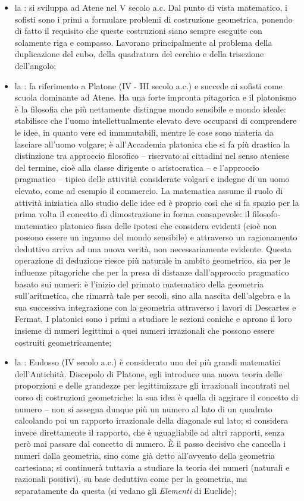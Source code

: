 \begin{itemize}
	\item la : si sviluppa ad Atene nel V secolo a.c. Dal punto di vista matematico, i sofisti sono i primi a formulare problemi di costruzione geometrica, ponendo di fatto il requisito che queste costruzioni siano sempre eseguite con solamente riga e compasso. Lavorano principalmente al problema della duplicazione del cubo, della quadratura del cerchio e della trisezione dell'angolo;
	\item la : fa riferimento a Platone (IV - III secolo a.c.) e succede ai sofisti come scuola dominante ad Atene. Ha una forte impronta pitagorica e il platonismo \`e la filosofia che pi\`u nettamente distingue mondo sensibile e mondo ideale: stabilisce che l'uomo intellettualmente elevato deve occuparsi di comprendere le idee, in quanto vere ed immmutabili, mentre le cose sono materia da lasciare all'uomo volgare; \`e all'Accademia platonica che si fa pi\`u drastica la distinzione tra approccio filosofico -- riservato ai cittadini nel senso ateniese del termine, cio\`e alla classe dirigente o aristocratica -- e l'approccio pragmatico -- tipico delle attiviti\`a considerate volgari e indegne di un uomo elevato, come ad esempio il commercio. La matematica assume il ruolo di attivit\`a iniziatica allo studio delle idee ed \`e proprio cos\`i che si fa spazio per la prima volta il concetto di dimostrazione in forma consapevole: il filosofo-matematico platonico fissa delle ipotesi che considera evidenti (cio\`e non possono essere un inganno del mondo sensibile) e attraverso un ragionamento deduttivo arriva ad una nuova verit\`a, non necessariamente evidente. Questa operazione di deduzione riesce pi\`u naturale in ambito geometrico, sia per le influenze pitagoriche che per la presa di distanze dall'approccio pragmatico basato sui numeri: \`e l'inizio del primato matematico della geometria sull'aritmetica, che rimarr\`a tale per secoli, sino alla nascita dell'algebra e la sua successiva integrazione con la geometria attraverso i lavori di Descartes e Fermat. I platonici sono i primi a studiare le sezioni coniche e aprono il loro insieme di numeri legittimi a quei numeri irrazionali che possono essere costruiti geometricamente;
	\item la : Eudosso (IV secolo a.c.) \`e considerato uno dei pi\`u grandi matematici dell'Antichit\`a. Discepolo di Platone, egli introduce una nuova teoria delle proporzioni e delle grandezze per legittimizzare gli irrazionali incontrati nel corso di costruzioni geometriche: la sua idea \`e quella di aggirare il concetto di numero -- non si assegna dunque pi\`u un numero al lato di un quadrato calcolando poi un rapporto irrazionale della diagonale sul lato; si considera invece direttamente il rapporto, che \`e uguagliabile ad altri rapporti, senza per\`o mai passare dal concetto di numero. \`E il passo decisivo che cancella i numeri dalla geometria, sino come gi\`a detto all'avvento della geometria cartesiana; si continuer\`a tuttavia a studiare la teoria dei numeri (naturali e razionali positivi), su base deduttiva come per la geometria, ma separatamente da questa (si vedano gli \textit{Elementi} di Euclide);

\end{itemize}
